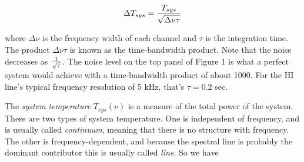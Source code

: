 \begin{equation}
\Delta T_{sys} = { T_{sys} \over \sqrt{ \Delta \nu \tau}}
\end{equation}

\noindent where $\Delta \nu$ is the frequency width of each channel and
$\tau$ is the integration time. The product $\Delta \nu \tau$ is known
as the time-bandwidth product. Note that the noise decreases as $1 \over
\sqrt{\tau}$. The noise level on the top panel of Figure 1 is what a
perfect system would achieve with a time-bandwidth product of about
1000. For the HI line's typical frequency resolution of 5 kHz, that's
$\tau = 0.2$ sec. 

	The {\it system temperature} $T_{sys}(\nu)$ is a measure of the
total power of the system. There are two types of system temperature.
One is independent of frequency, and is usually called {\it continuum},
meaning that there is no structure with frequency. The other is
frequency-dependent, and because the spectral line is probably the
dominant contributor this is usually called {\it line}. So we have
